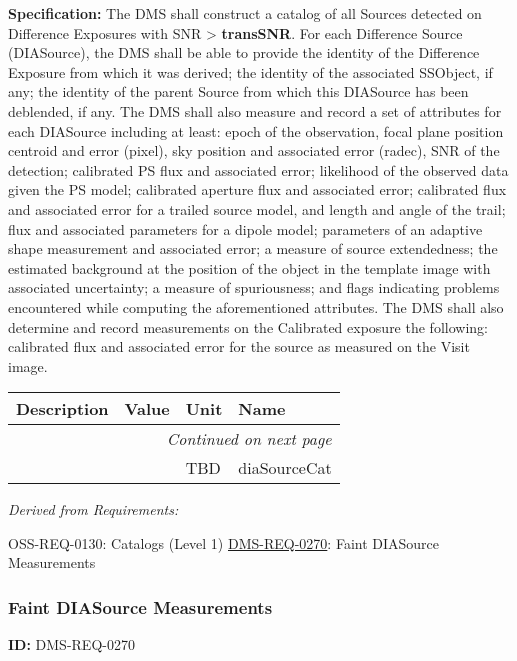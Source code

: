 \documentclass[SE,toc,lsstdraft]{lsstdoc}
\makeatletter
\newcommand{\paramname}[1]{\hspace{0pt}#1}
\newcommand{\unitname}[1]{\hspace{0pt}#1}
\newenvironment{parameters}[0]{%
\setlength\LTleft{0pt}
\setlength\LTright{\fill}
\begin{small}
\begin{longtable}[]{|p{0.5\textwidth}|l|p{0.6in}|p{1.74in}@{}|}

\hline \textbf{Description} & \textbf{Value} & \textbf{Unit} & \textbf{Name} \\ \hline
\endhead

\hline \multicolumn{4}{r}{\emph{Continued on next page}} \\
\endfoot

\hline\hline
\endlastfoot
}{%
\hline
\end{longtable}
\end{small}
}
\makeatother
\begin{document}
\textbf{Specification:} The DMS shall construct a catalog of all Sources detected on Difference Exposures with SNR > \textbf{transSNR}. For each Difference Source (DIASource), the DMS shall be able to provide the identity of the Difference Exposure from which it was derived; the identity of the associated SSObject, if any; the identity of the parent Source from which this DIASource has been deblended, if any. The DMS shall also measure and record a set of attributes for each DIASource including at least: epoch of the observation, focal plane position centroid and error (pixel), sky position and associated error (radec), SNR of the detection; calibrated PS flux and associated error; likelihood of the observed data given the PS model; calibrated aperture flux and associated error; calibrated flux and associated error for a trailed source model, and length and angle of the trail; flux and associated parameters for a dipole model; parameters of an adaptive shape measurement and associated error; a measure of source extendedness; the estimated background at the position of the object in the template image with associated uncertainty; a measure of spuriousness; and flags indicating problems encountered while computing the aforementioned attributes. The DMS shall also determine and record measurements on the Calibrated exposure the following: calibrated flux and associated error for the source as measured on the Visit image.





\begin{parameters}

&

&
\unitname{%
TBD
}
&
\paramname{%
diaSourceCat
} \\\hline
\end{parameters}




\emph{Derived from Requirements:}

OSS-REQ-0130:
Catalogs (Level 1) \newline
\hyperref[DMS-REQ-0270]{DMS-REQ-0270}:
Faint DIASource Measurements \newline


\subsubsection{Faint DIASource Measurements}

\label{DMS-REQ-0270}
\textbf{ID:} DMS-REQ-0270
\end{document}
